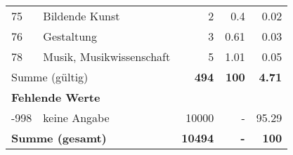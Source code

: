 \begin{longtable}{lXrrr}
        75 & \multicolumn{1}{X}{Bildende Kunst} & %
          \num{2} &
          \num[round-mode=places,round-precision=2]{0.4} &
          \num[round-mode=places,round-precision=2]{0.02} \\

        76 & \multicolumn{1}{X}{Gestaltung} & %
          \num{3} &
          \num[round-mode=places,round-precision=2]{0.61} &
          \num[round-mode=places,round-precision=2]{0.03} \\

        78 & \multicolumn{1}{X}{Musik, Musikwissenschaft} & %
          \num{5} &
          \num[round-mode=places,round-precision=2]{1.01} &
          \num[round-mode=places,round-precision=2]{0.05} \\

     \midrule
     \multicolumn{2}{l}{Summe (gültig)} &
       \textbf{\num{494}} &
     \textbf{\num{100}} &
       \textbf{\num[round-mode=places,round-precision=2]{4.71}} \\
     \multicolumn{5}{l}{\textbf{Fehlende Werte}}\\
       -998 &
       keine Angabe &
         \num{10000} &
        - &
         \num[round-mode=places,round-precision=2]{95.29} \\
     \midrule
     \multicolumn{2}{l}{\textbf{Summe (gesamt)}} &
          \textbf{\num{10494}} &
        \textbf{-} &
        \textbf{\num{100}} \\
     \bottomrule
     \end{longtable}
     
